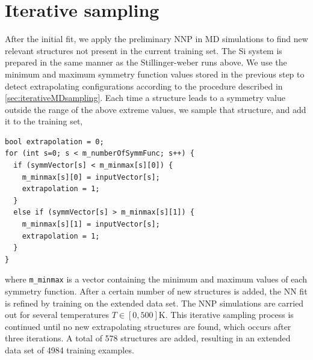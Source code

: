 \documentclass[twoside,english]{uiofysmaster}
\begin{document}
\section{Iterative sampling} \label{sec:SiIterativeSampling}
After the initial fit, we apply the preliminary NNP in MD simulations to find new relevant structures not present 
in the current training set. The Si system is prepared in the same manner as the Stillinger-weber runs above. 
We use the minimum and maximum symmetry function values stored in the previous step to detect extrapolating
configurations according to the procedure described in \autoref{sec:iterativeMDsampling}. Each time a structure
leads to a symmetry value outside the range of the above extreme values, we sample that structure, and add 
it to the training set, 
\begin{verbatim}
bool extrapolation = 0;
for (int s=0; s < m_numberOfSymmFunc; s++) {
  if (symmVector[s] < m_minmax[s][0]) {
    m_minmax[s][0] = inputVector[s];
    extrapolation = 1;
  }
  else if (symmVector[s] > m_minmax[s][1]) {
    m_minmax[s][1] = inputVector[s];
    extrapolation = 1;
  }
}
\end{verbatim}
where \texttt{m\_minmax} is a vector containing the minimum and maximum values of each symmetry function.
After a certain number of new structures is added, the NN fit is refined by training on the extended data set. 
The NNP simulations are carried out for several temperatures $T \in [0,500] \mathrm{K}$. 
This iterative sampling process is continued until no new extrapolating structures are found, which occurs 
after three iterations. A total of 578 structures are added, resulting in an extended data set of 4984 training examples. 
\end{document}
